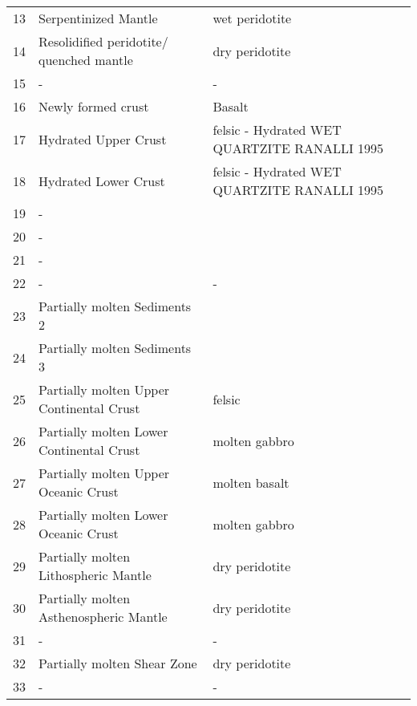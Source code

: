 \begin{table}[H]
\begin{tabular}{l p{6cm} p{8cm}}
\rowcolor[rgb]{0         0    0.4902}
13 & Serpentinized Mantle & wet peridotite \\
\rowcolor[rgb]{ 0.7000    0.1200    0.3000}
14 & Resolidified peridotite/ quenched mantle & dry peridotite \\
\rowcolor[rgb]{1.0000    1.0000    1.0000}
15 & - & - \\
\rowcolor[rgb]{0.3137    0.8941    0.2470}
16 & Newly formed crust & Basalt \\
\rowcolor[rgb]{0.5412    0.7216    0.9922}
17 & Hydrated Upper Crust & felsic - Hydrated WET QUARTZITE RANALLI 1995 \\
\rowcolor[rgb]{0.5412    0.7216    0.9922}
18 & Hydrated Lower Crust & felsic - Hydrated WET QUARTZITE RANALLI 1995 \\
\rowcolor[rgb]{1.0000    1.0000    1.0000}
19 & - & \\
\midrule
\rowcolor[rgb]{1.0000    1.0000    1.0000}
20 & - & \\
\rowcolor[rgb]{1.0000    1.0000    1.0000}
21 & - & \\
\rowcolor[rgb]{1.0000    1.0000    1.0000}
22 & - & - \\
\rowcolor[rgb]{1.0000    1.0000    0.3176}
23 & Partially molten Sediments 2 & \\
\rowcolor[rgb]{1.0000    0.9020    0.1882}
24 & Partially molten Sediments 3 & \\
\rowcolor[rgb]{0.4667    0.4667    0.2353}
25 & Partially molten Upper Continental Crust & felsic \\
\rowcolor[rgb]{0.5020    0.5020         0}
26 & Partially molten Lower Continental Crust & molten gabbro \\
\rowcolor[rgb]{0.7255    0.0157    0.7843}
27 & Partially molten Upper Oceanic Crust & molten basalt \\
\rowcolor[rgb]{0.9255    0.4392    0.9961}
28 & Partially molten Lower Oceanic Crust & molten gabbro \\
\rowcolor[rgb]{1.0000         0         0}
29 & Partially molten Lithospheric Mantle & dry peridotite \\
\rowcolor[rgb]{1.0000         0         0}
30 & Partially molten Asthenospheric Mantle & dry peridotite \\
\rowcolor[rgb]{1.0000    1.0000    1.0000}
31 & - & -\\
\rowcolor[rgb]{0.8471    0.0784    0.1529}
32 & Partially molten Shear Zone & dry peridotite \\
\rowcolor[rgb]{1.0000    1.0000    1.0000}
33 & - & -\\

\end{tabular}
\end{table}
